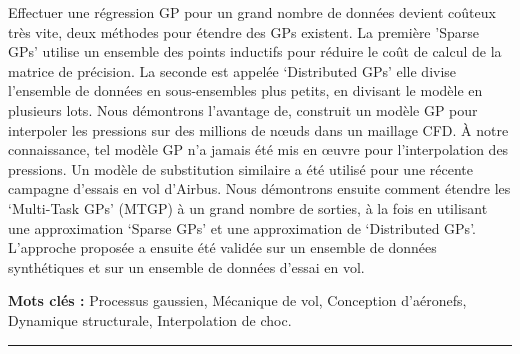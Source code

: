 Effectuer une régression GP pour un grand nombre de données devient coûteux très vite, deux méthodes pour étendre des GPs existent. La première 'Sparse GPs' utilise un ensemble des points inductifs pour réduire le coût de calcul de la matrice de précision. La seconde est appelée `Distributed GPs' elle divise l'ensemble de données en sous-ensembles plus petits, en divisant le modèle en plusieurs lots. Nous démontrons l’avantage de, construit un modèle GP pour interpoler les pressions sur des millions de nœuds dans un maillage CFD. À notre connaissance, tel modèle GP n'a jamais été mis en œuvre pour l'interpolation des pressions. Un modèle de substitution similaire a été utilisé pour une récente campagne d'essais en vol d'Airbus. Nous démontrons ensuite comment étendre les `Multi-Task GPs' (MTGP) à un grand nombre de sorties, à la fois en utilisant une approximation `Sparse GPs’ et une approximation de `Distributed GPs'. L'approche proposée a ensuite été validée sur un ensemble de données synthétiques et sur un ensemble de données d'essai en vol.

{\large\textbf{Mots clés :}}
    Processus gaussien, Mécanique de vol, Conception d'aéronefs, Dynamique structurale, Interpolation de choc.
\\
\noindent\rule[2pt]{\textwidth}{0.5pt}






